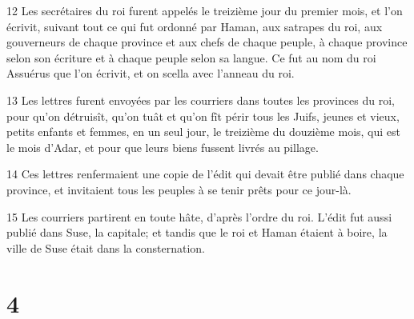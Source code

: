 \par 12 Les secrétaires du roi furent appelés le treizième jour du premier mois, et l'on écrivit, suivant tout ce qui fut ordonné par Haman, aux satrapes du roi, aux gouverneurs de chaque province et aux chefs de chaque peuple, à chaque province selon son écriture et à chaque peuple selon sa langue. Ce fut au nom du roi Assuérus que l'on écrivit, et on scella avec l'anneau du roi.
\par 13 Les lettres furent envoyées par les courriers dans toutes les provinces du roi, pour qu'on détruisît, qu'on tuât et qu'on fît périr tous les Juifs, jeunes et vieux, petits enfants et femmes, en un seul jour, le treizième du douzième mois, qui est le mois d'Adar, et pour que leurs biens fussent livrés au pillage.
\par 14 Ces lettres renfermaient une copie de l'édit qui devait être publié dans chaque province, et invitaient tous les peuples à se tenir prêts pour ce jour-là.
\par 15 Les courriers partirent en toute hâte, d'après l'ordre du roi. L'édit fut aussi publié dans Suse, la capitale; et tandis que le roi et Haman étaient à boire, la ville de Suse était dans la consternation.

\chapter{4}

